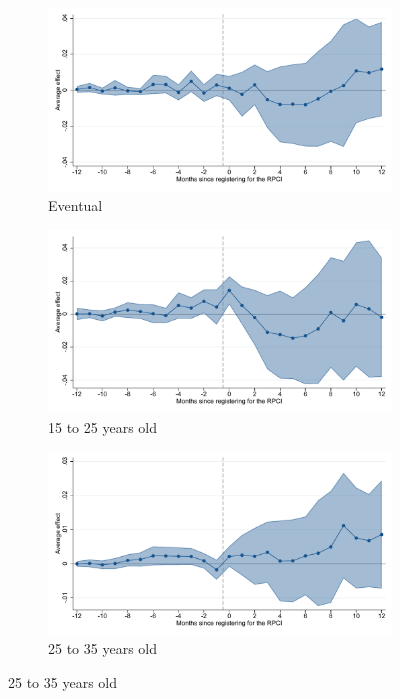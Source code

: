 \begin{figure}[H]
    \begin{subfigure}{0.32\textwidth}
    \caption{Eventual}
    \includegraphics[width=\textwidth]{04_Figures/muestra_10porciento/event_study_alta_base_te_dcdh_connected.pdf}
    \end{subfigure}
    \begin{subfigure}{0.32\textwidth}
    \caption{15 to 25 years old}
    \includegraphics[width=\textwidth]{04_Figures/muestra_10porciento/event_study_alta_age_15_25_dcdh_connected.pdf}
    \end{subfigure}
    \begin{subfigure}{0.32\textwidth}
    \caption{25 to 35 years old}
    \includegraphics[width=\textwidth]{04_Figures/muestra_10porciento/event_study_alta_age_25_35_dcdh_connected.pdf}
    \end{subfigure}


\end{figure}
